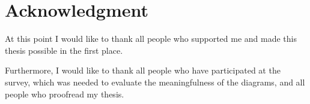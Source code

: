 





\begingroup
\let\clearpage\relax
\let\cleardoublepage\relax
\let\cleardoublepage\relax
\chapter*{Acknowledgment}
At this point I would like to thank all people who supported me and made this thesis possible 
in the first place.

Furthermore, I would like to thank all people who have participated at the survey, which was needed to evaluate the meaningfulness of the diagrams, and all people who proofread my thesis.


\endgroup




